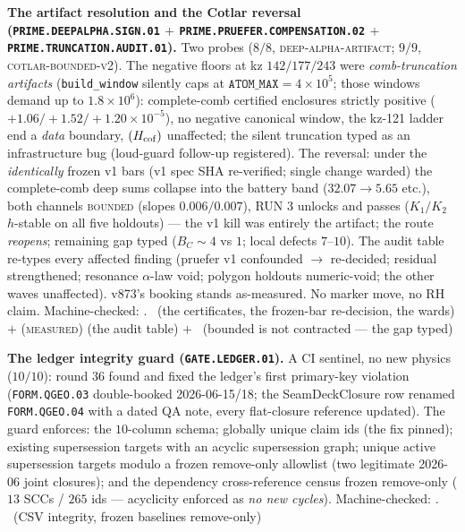 \documentclass[11pt,a4paper]{article}
\theoremstyle{definition}
\begin{document}
\par\smallskip\noindent\textbf{The artifact resolution and the
Cotlar reversal (\texttt{PRIME.DEEPALPHA.SIGN.01} $+$
\texttt{PRIME.PRUEFER.\allowbreak COMPENSATION.02} $+$
\texttt{PRIME.TRUNCATION.\allowbreak AUDIT.01}).}
Two probes ($8/8$, \textsc{deep-alpha-artifact}; $9/9$,
\textsc{cotlar-bounded-v2}).  The negative floors at kz
$142/177/243$ were \emph{comb-truncation artifacts}
(\texttt{build\_window} silently caps at $\texttt{ATOM\_MAX} =
4\times10^5$; those windows demand up to $1.8\times10^6$):
complete-comb certified enclosures strictly positive
($+1.06/+1.52/+1.20 \times 10^{-5}$), no negative canonical
window, the kz-121 ladder end a \emph{data} boundary, $(H_{\rm
cof})$ unaffected; the silent truncation typed as an
infrastructure bug (loud-guard follow-up registered).  The
reversal: under the \emph{identically} frozen v1 bars (v1 spec
SHA re-verified; single change warded) the complete-comb deep
sums collapse into the battery band ($32.07 \to 5.65$ etc.),
both channels \textsc{bounded} (slopes $0.006/0.007$), RUN 3
unlocks and passes ($K_1/K_2$ $h$-stable on all five holdouts)
--- the v1 kill was entirely the artifact; the route
\emph{reopens}; remaining gap typed ($B_C \sim 4$ vs $1$; local
defects $7$--$10$).  The audit table re-types every affected
finding (pruefer v1 confounded $\to$ re-decided; residual
strengthened; resonance $\alpha$-law void; polygon holdouts
numeric-void; the other waves unaffected).  v873's booking
stands as-measured.  No marker move, no RH claim.
Machine-checked: .
\mE\ (the certificates, the frozen-bar re-decision, the wards)
$+$ (\textsc{measured}) (the audit table) $+$ \mO\ (bounded is
not contracted --- the gap typed)
\par\smallskip

\par\smallskip\noindent\textbf{The ledger integrity guard
(\texttt{GATE.LEDGER.01}).}
A CI sentinel, no new physics ($10/10$): round 36 found and
fixed the ledger's first primary-key violation
(\texttt{FORM.QGEO.03} double-booked 2026-06-15/18; the
SeamDeckClosure row renamed \texttt{FORM.QGEO.04} with a dated
QA note, every flat-closure reference updated).  The guard
enforces: the $10$-column schema; globally unique claim ids
(the fix pinned); existing supersession targets with an acyclic
supersession graph; unique active supersession targets modulo a
frozen remove-only allowlist (two legitimate 2026-06 joint
closures); and the dependency cross-reference census frozen
remove-only ($13$ SCCs / $265$ ids --- acyclicity enforced as
\emph{no new cycles}).
Machine-checked: .
\mE\ (CSV integrity, frozen baselines remove-only)
\par\smallskip
\end{document}
